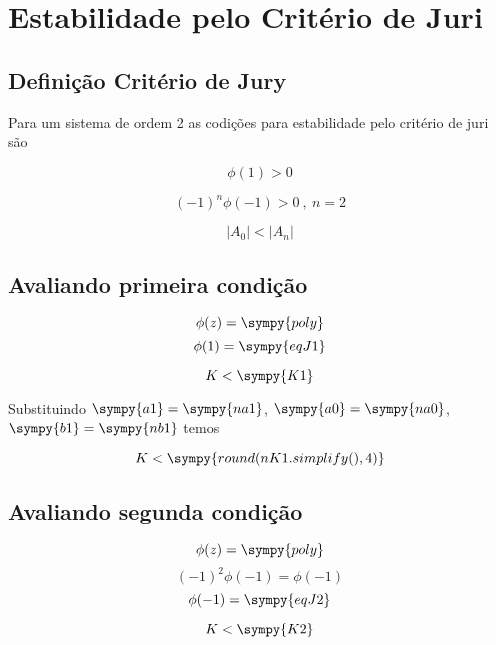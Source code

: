 \documentclass[a4paper,11pt]{article}
\newcommand{\npy}[1]{\sympy{round(#1,4)}}
\begin{document}
\section{Estabilidade pelo Critério de Juri}

\subsection{Definição Critério de Jury}

Para um sistema de ordem 2 as codições para estabilidade pelo critério de juri são

\begin{equation}\label{eq:jury-c1}
    \phi(1) > 0
\end{equation}

\begin{equation}\label{eq:jury-c2}
    (-1)^n\phi(-1) > 0\ ,\ n=2
\end{equation}

\begin{equation}\label{eq:jury-c3}
    |A_0| < |A_n|
\end{equation}

\subsection{Avaliando primeira condição}

$$\phi(z) = \sympy{poly}$$
$$\phi(1) = \sympy{eqJ1}$$

\begin{equation}\label{eq:k-jury-c1}
    K < \sympy{K1}
\end{equation}

Substituindo $\sympy{a1} = \sympy{na1}$, $\sympy{a0} = \sympy{na0}$, $\sympy{b1} = \sympy{nb1}$ temos

\begin{equation}\label{eq:k-jury-c1-numeric}
    K < \npy{nK1.simplify()}
\end{equation}

\subsection{Avaliando segunda condição}

$$\phi(z) = \sympy{poly}$$
$$(-1)^2\phi(-1) = \phi(-1)$$
$$\phi(-1) = \sympy{eqJ2}$$

\begin{equation}\label{eq:k-jury-c2}
    K < \sympy{K2}
\end{equation}
\end{document}
